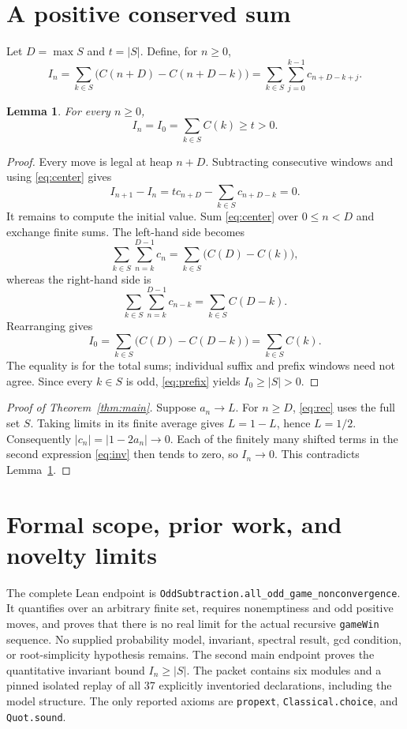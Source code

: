 \documentclass[11pt]{article}
\newtheorem{lemma}[theorem]{Lemma}
\begin{document}
\section{A positive conserved sum}
Let $D=\max S$ and $t=|S|$. Define, for $n\geq0$,
\begin{equation}\label{eq:inv}
 I_n=\sum_{k\in S}\bigl(C(n+D)-C(n+D-k)\bigr)
     =\sum_{k\in S}\sum_{j=0}^{k-1}c_{n+D-k+j}.
\end{equation}

\begin{lemma}\label{lem:invariant}
For every $n\geq0$,
\[
 I_n=I_0=\sum_{k\in S}C(k)\geq t>0.
\]
\end{lemma}
\begin{proof}
Every move is legal at heap $n+D$. Subtracting consecutive windows and
using \eqref{eq:center} gives
\[
 I_{n+1}-I_n=t c_{n+D}-\sum_{k\in S}c_{n+D-k}=0.
\]
It remains to compute the initial value. Sum \eqref{eq:center} over
$0\leq n<D$ and exchange finite sums. The left-hand side becomes
\[
 \sum_{k\in S}\sum_{n=k}^{D-1}c_n
       =\sum_{k\in S}\bigl(C(D)-C(k)\bigr),
\]
whereas the right-hand side is
\[
 \sum_{k\in S}\sum_{n=k}^{D-1}c_{n-k}
       =\sum_{k\in S}C(D-k).
\]
Rearranging gives
\[
 I_0=\sum_{k\in S}\bigl(C(D)-C(D-k)\bigr)
     =\sum_{k\in S}C(k).
\]
The equality is for the total sums; individual suffix and prefix windows
need not agree. Since every $k\in S$ is odd, \eqref{eq:prefix} yields
$I_0\geq |S|>0$.
\end{proof}

\begin{proof}[Proof of Theorem~\ref{thm:main}]
Suppose $a_n\to L$. For $n\geq D$, \eqref{eq:rec} uses the full set $S$.
Taking limits in its finite average gives $L=1-L$, hence $L=1/2$.
Consequently $|c_n|=|1-2a_n|\to0$.
Each of the finitely many shifted terms in the second expression
\eqref{eq:inv} then tends to zero, so $I_n\to0$.
This contradicts Lemma~\ref{lem:invariant}.
\end{proof}

\section{Formal scope, prior work, and novelty limits}
The complete Lean endpoint is
\texttt{OddSubtraction.all\_odd\_game\_nonconvergence}. It quantifies over
an arbitrary finite set, requires nonemptiness and odd positive moves,
and proves that there is no real limit for the actual recursive
\texttt{gameWin} sequence. No supplied probability model, invariant,
spectral result, gcd condition, or root-simplicity hypothesis remains.
The second main endpoint proves the quantitative invariant bound
$I_n\geq|S|$. The packet contains six modules and a pinned isolated replay
of all 37 explicitly inventoried declarations, including the model
structure. The only reported axioms are \texttt{propext},
\texttt{Classical.choice}, and \texttt{Quot.sound}.
\end{document}
